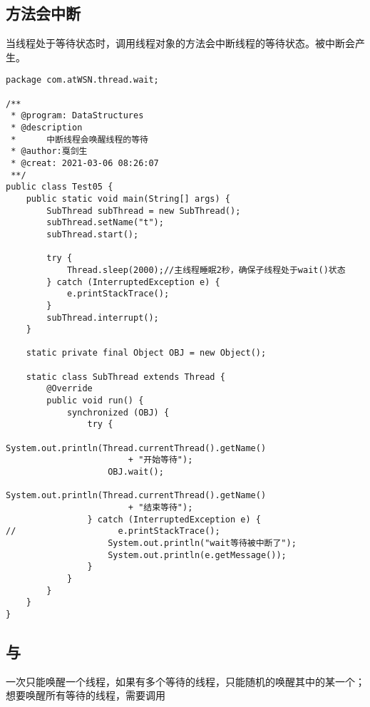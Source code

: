 \documentclass[a4paper]{report}
\begin{document}
\subsection{方法会中断}
当线程处于等待状态时，调用线程对象的方法会中断线程的等待状态。被中断会产生。

\begin{Verbatim}[frame=single,numbersep=5pt,xleftmargin=1.5em,xrightmargin=1.5em]
package com.atWSN.thread.wait;

/**
 * @program: DataStructures
 * @description
 *      中断线程会唤醒线程的等待
 * @author:戛剑生
 * @creat: 2021-03-06 08:26:07
 **/
public class Test05 {
    public static void main(String[] args) {
        SubThread subThread = new SubThread();
        subThread.setName("t");
        subThread.start();

        try {
            Thread.sleep(2000);//主线程睡眠2秒，确保子线程处于wait()状态
        } catch (InterruptedException e) {
            e.printStackTrace();
        }
        subThread.interrupt();
    }

    static private final Object OBJ = new Object();

    static class SubThread extends Thread {
        @Override
        public void run() {
            synchronized (OBJ) {
                try {
                    System.out.println(Thread.currentThread().getName() 
                        + "开始等待");
                    OBJ.wait();
                    System.out.println(Thread.currentThread().getName() 
                        + "结束等待");
                } catch (InterruptedException e) {
//                    e.printStackTrace();
                    System.out.println("wait等待被中断了");
                    System.out.println(e.getMessage());
                }
            }
        }
    }
}\end{Verbatim}
\subsection{与}
一次只能唤醒一个线程，如果有多个等待的线程，只能随机的唤醒其中的某一个；想要唤醒所有等待的线程，需要调用
\end{document}
